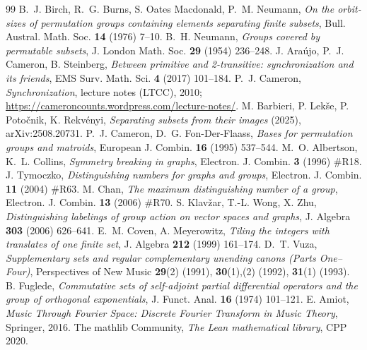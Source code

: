 \documentclass[11pt]{article}
\begin{document}

\begin{thebibliography}{99}
 B.~J. Birch, R.~G. Burns, S. Oates Macdonald, P.~M. Neumann,
  \emph{On the orbit-sizes of permutation groups containing elements separating
  finite subsets}, Bull. Austral. Math. Soc. \textbf{14} (1976) 7--10.
 B.~H. Neumann, \emph{Groups covered by permutable
  subsets}, J. London Math. Soc. \textbf{29} (1954) 236--248.
 J. Araújo, P.~J. Cameron, B. Steinberg, \emph{Between primitive
  and 2-transitive: synchronization and its friends}, EMS Surv. Math. Sci.
  \textbf{4} (2017) 101--184.
 P.~J. Cameron, \emph{Synchronization}, lecture notes
  (LTCC), 2010; \url{https://cameroncounts.wordpress.com/lecture-notes/}.
 M. Barbieri, P. Lekše, P. Potočnik, K. Rekvényi,
  \emph{Separating subsets from their images} (2025), arXiv:2508.20731.
 P.~J. Cameron, D.~G. Fon-Der-Flaass, \emph{Bases for
  permutation groups and matroids}, European J. Combin. \textbf{16} (1995)
  537--544.
 M.~O. Albertson, K.~L. Collins, \emph{Symmetry
  breaking in graphs}, Electron. J. Combin. \textbf{3} (1996) \#R18.
 J. Tymoczko, \emph{Distinguishing numbers for graphs and
  groups}, Electron. J. Combin. \textbf{11} (2004) \#R63.
 M. Chan, \emph{The maximum distinguishing number of a group},
  Electron. J. Combin. \textbf{13} (2006) \#R70.
 S. Klavžar, T.-L. Wong, X. Zhu, \emph{Distinguishing labelings
  of group action on vector spaces and graphs}, J. Algebra \textbf{303} (2006)
  626--641.
 E.~M. Coven, A. Meyerowitz, \emph{Tiling the
  integers with translates of one finite set}, J. Algebra \textbf{212} (1999)
  161--174.
 D.~T. Vuza, \emph{Supplementary sets and regular complementary
  unending canons (Parts One--Four)}, Perspectives of New Music \textbf{29}(2)
  (1991), \textbf{30}(1),(2) (1992), \textbf{31}(1) (1993).
 B. Fuglede, \emph{Commutative sets of self-adjoint partial
  differential operators and the group of orthogonal exponentials}, J. Funct.
  Anal. \textbf{16} (1974) 101--121.
 E. Amiot, \emph{Music Through Fourier Space: Discrete Fourier
  Transform in Music Theory}, Springer, 2016.
 The mathlib Community, \emph{The Lean mathematical library},
  CPP 2020.
\end{thebibliography}
\end{document}
